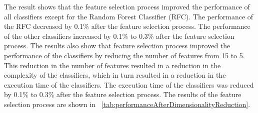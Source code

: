 \documentclass[conference,onecolumn]{IEEEtran}
\begin{document}
        The result shows that the feature selection process improved the performance of all classifiers except for the Random Forest Classifier (RFC). The performance of the RFC decreased by 0.1\% after the feature selection process. The performance of the other classifiers increased by 0.1\% to 0.3\% after the feature selection process. The results also show that feature selection process improved the performance of the classifiers by reducing the number of features from 15 to 5. This reduction in the number of features resulted in a reduction in the complexity of the classifiers, which in turn resulted in a reduction in the execution time of the classifiers. The execution time of the classifiers was reduced by 0.1\% to 0.3\% after the feature selection process. The results of the feature selection process are shown in \tablename~\ref{tab:performanceAfterDimensionalityReduction}.
        
\end{document}
